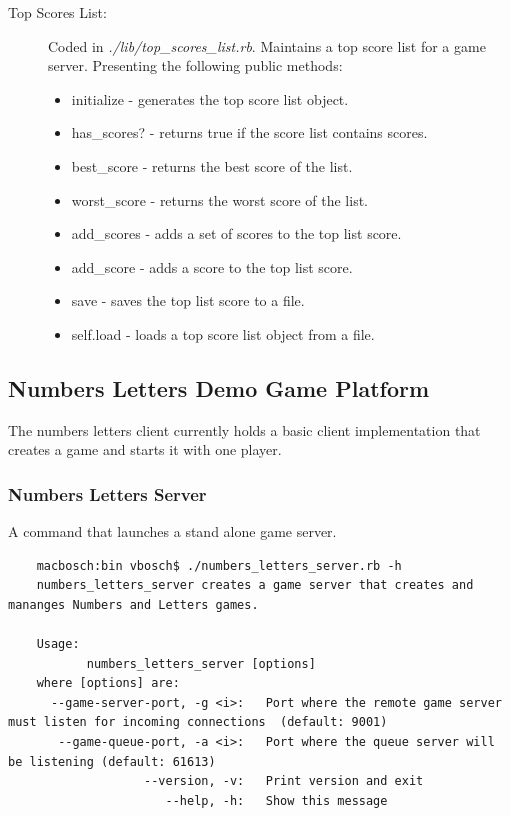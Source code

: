 \documentclass[a4paper,10pt,titlepage]{article}
\begin{document}
\begin{description}
	\item[Top Scores List:] Coded in \textit{./lib/top\_scores\_list.rb}. Maintains a top score list for a game server. Presenting the following public methods:
	\begin{itemize}
		\item initialize - generates the top score list object.
		\item has\_scores? - returns true if the score list contains scores.
		\item best\_score - returns the best score of the list.
		\item worst\_score - returns the worst score of the list.
		\item add\_scores - adds a set of scores to the top list score.
		\item add\_score - adds a score to the top list score.
		\item save - saves the top list score to a file.
		\item self.load - loads a top score list object from a file.
	\end{itemize}
	
\end{description}	
		
\subsection{Numbers Letters Demo Game Platform}

\par The numbers letters client currently holds a basic client implementation that creates a game and starts it with one player.

\subsubsection{Numbers Letters Server}

\par A command that launches a stand alone game server.

{\footnotesize\begin{verbatim}
	macbosch:bin vbosch$ ./numbers_letters_server.rb -h
	numbers_letters_server creates a game server that creates and mananges Numbers and Letters games.

	Usage:
	       numbers_letters_server [options]
	where [options] are:
	  --game-server-port, -g <i>:   Port where the remote game server must listen for incoming connections  (default: 9001)
	   --game-queue-port, -a <i>:   Port where the queue server will be listening (default: 61613)
	               --version, -v:   Print version and exit
	                  --help, -h:   Show this message
\end{verbatim}}
\end{document}
